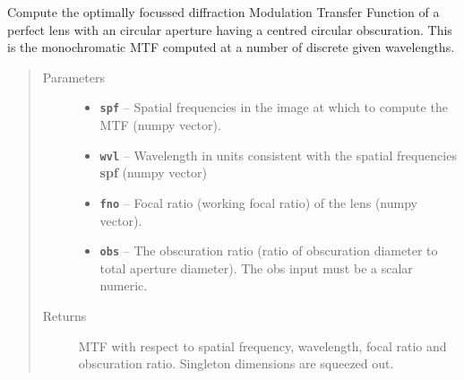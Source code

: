 \documentclass[a4paper,10pt,english]{sphinxmanual}
\begin{document}
\begin{fulllineitems}
\label{packages:optics.mtf_obs}
Compute the optimally focussed diffraction Modulation Transfer Function of a perfect lens with an
circular aperture having a centred circular obscuration. This is the monochromatic MTF computed at
a number of discrete given wavelengths.
\begin{quote}\begin{description}
\item[{Parameters}] \leavevmode\begin{itemize}
\item {} 
\textbf{\texttt{spf}} -- Spatial frequencies in the image at which to compute the MTF (numpy vector).

\item {} 
\textbf{\texttt{wvl}} -- Wavelength in units consistent with the spatial frequencies \textbf{spf} (numpy vector)

\item {} 
\textbf{\texttt{fno}} -- Focal ratio (working focal ratio) of the lens (numpy vector).

\item {} 
\textbf{\texttt{obs}} -- The obscuration ratio (ratio of obscuration diameter to total aperture diameter).
The obs input must be a scalar numeric.

\end{itemize}

\item[{Returns}] \leavevmode
MTF with respect to spatial frequency, wavelength, focal ratio and obscuration ratio.
Singleton dimensions are squeezed out.

\end{description}\end{quote}

\end{fulllineitems}

\end{document}
